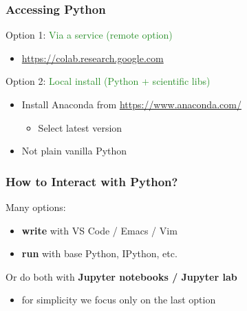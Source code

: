 \documentclass[
    xcolor={svgnames,dvipsnames},
    hyperref={colorlinks, citecolor=DeepPink4, linkcolor=DarkRed, urlcolor=DarkBlue}
    ]{beamer}  %
\newcommand{\green}[1]{\textcolor{ForestGreen}{\sf #1}}
\newcommand{\emp}[1]{\textcolor{DarkOrange1}{\bf #1}}
\newcommand{\1}{\mathbbm 1}
\begin{document}
\begin{frame}
    \frametitle{Accessing Python}

    Option 1: \green{Via a service (remote option)}

    \begin{itemize}
        \item \url{https://colab.research.google.com}
    \end{itemize}

    \vspace{1em}

    Option 2: \green{Local install (Python + scientific libs)}
    
    \begin{itemize}
        \item Install Anaconda from {\footnotesize \url{https://www.anaconda.com/}}
        \vspace{1em}
            \begin{itemize}
                \item Select latest version 
            \end{itemize}
        \vspace{1em}
        \item Not plain vanilla Python
    \end{itemize}




\end{frame}



\begin{frame}
    \frametitle{How to Interact with Python?}

    Many options:

    \begin{itemize}
        \item \emp{write} with VS Code / Emacs / Vim
            \vspace{0.5em}
        \item \emp{run} with base Python, IPython, etc.
    \end{itemize}

            \vspace{0.5em}
            \vspace{0.5em}
            \vspace{0.5em}
        Or do both with \emp{Jupyter notebooks / Jupyter lab}

            \vspace{0.5em}
    \begin{itemize}
        \item for simplicity we focus only on the last option
    \end{itemize}

\end{frame}
\end{document}
